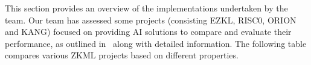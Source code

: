 \documentclass[conference]{IEEEtran}
\begin{document}
This section provides an overview of the implementations undertaken by the team. Our team has assessed some projects (consisting EZKL, RISC0, ORION and KANG) focused on providing AI solutions to compare and evaluate their performance, as outlined in~\cite{BrainbenchXYZ} along with detailed information. The following table compares various ZKML projects based on different properties.

\begin{figure}[!ht]
\end{figure}
\end{document}
